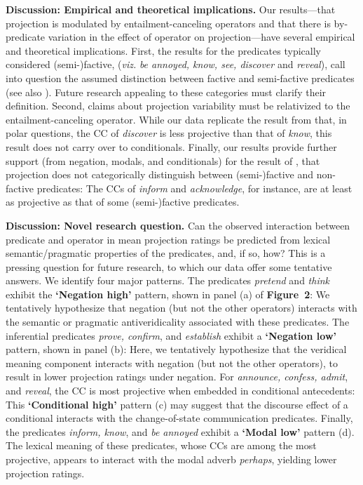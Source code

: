 \documentclass[12pt, letterpaper]{article}
\begin{document}

\noindent
{\bf Discussion:  Empirical and theoretical implications.} 
	Our results---that projection is modulated by entailment-canceling operators and that there is by-predicate variation in the effect of operator on projection---have several empirical and theoretical implications. First, the results for the predicates typically considered (semi-)factive, ({\em viz.} \emph{be annoyed, know, see, discover} and \emph{reveal}), call into question the assumed distinction between factive and semi-factive predicates (see also \citealp{beaver_have_2010}). Future research appealing to these categories must clarify their definition. Second, claims about projection variability must be relativized to the entailment-canceling operator. While our data replicate the result from \citet{tonhauser_how_2018} that, in polar questions, the CC of \emph{discover} is less projective than that of \emph{know}, this result does not carry over to conditionals. Finally, our results provide further support (from negation, modals, and conditionals) for the result of \citet{degen_are_2022}, that projection does not categorically distinguish between (semi-)factive and non-factive predicates: The CCs of \emph{inform} and \emph{acknowledge}, for instance, are at least as projective as that of some (semi-)factive predicates.
	
\noindent
{\bf Discussion: Novel research question.}
	Can the observed interaction between predicate and operator in mean projection ratings be predicted from lexical semantic/pragmatic properties of the predicates, and, if so, how?
	This is a pressing question for future research, to which our data offer some tentative answers. We identify four major patterns.
	The predicates \emph{pretend} and \emph{think} exhibit the {\bf `Negation high'} pattern, shown in panel (a) of \textbf{Figure~2}: We tentatively hypothesize that negation (but not the other operators) interacts with the semantic or pragmatic antiveridicality associated with these predicates.
	The inferential predicates \emph{prove, confirm}, and \emph{establish} exhibit a {\bf `Negation low'} pattern, shown in panel (b): Here, we tentatively hypothesize that the veridical meaning component interacts with negation (but not the other operators), to result in lower projection ratings under negation.
	For \emph{announce, confess, admit}, and \emph{reveal}, the CC is most projective when embedded in conditional antecedents: This {\bf `Conditional high'} pattern (c) may suggest that the discourse effect of a conditional interacts with the change-of-state communication predicates.
	Finally, the predicates  \emph{inform, know}, and \emph{be annoyed} exhibit a {\bf `Modal low'} pattern (d). The lexical meaning of these predicates, whose CCs are among the most projective, appears to interact with the modal adverb {\em perhaps}, yielding lower projection ratings.
\end{document}
